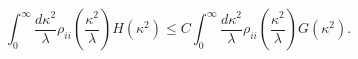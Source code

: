 \begin{equation}
\int_0 ^\infty \frac{d \kappa^2}{\lambda} \rho_{ii}\left( \frac{\kappa^2}{\lambda} \right)
H(\kappa^2) \leq C \int_0 ^\infty \frac{d\kappa^2}{\lambda} 
\rho_{ii}\left(\frac{\kappa^2}{\lambda}\right) G(\kappa^2).
\end{equation}

